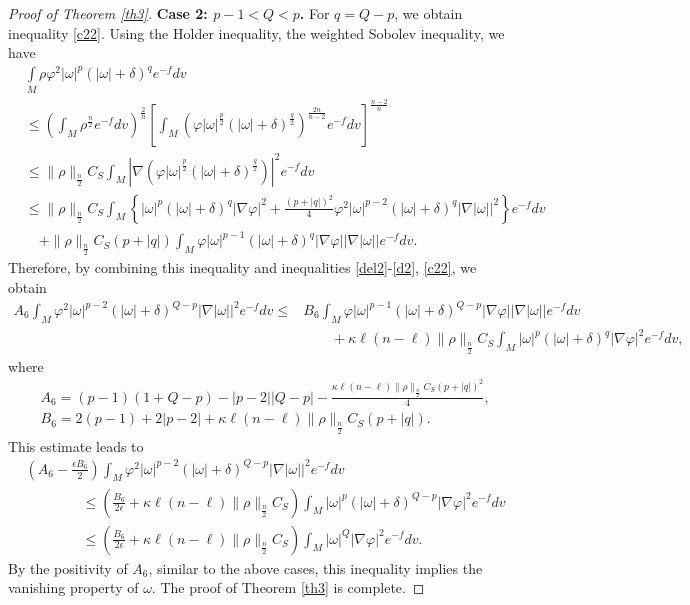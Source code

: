 \documentclass[10pt,a4paper]{amsart}
\numberwithin{equation}{section}
\begin{document}
\begin{proof}[Proof of Theorem \ref{th3}]
	\textbf{Case 2: $p-1<Q<p$.} For $q=Q-p$, we obtain inequality \eqref{c22}. Using the Holder inequality, the weighted Sobolev inequality, we have
	\begin{align*}
				&\int\limits_M \rho\varphi ^2|\omega |^{p}(|\omega|+\delta)^q e^{-f}dv\\
				&\le \left(\int_M \rho^{\frac{n}{2}}e^{-f}dv\right)^{\frac{2}{n}} \left[ \int_M \left(\varphi |\omega|^{\frac{p}{2}}(|\omega|+\delta)^{\frac{q}{2}}\right)^{\frac{2n}{n-2}}e^{-f}dv \right]^{\frac{n-2}{n}}\\
		&\le \|\rho\|_{\frac{n}{2}} C_S  \int_M \left|\nabla \left( \varphi |\omega|^{\frac{p}{2}}(|\omega|+\delta)^{\frac{q}{2}} \right)\right|^2 e^{-f}dv\\
			&\le \|\rho\|_{\frac{n}{2}} C_S  \int_M \left\{ |\omega|^p (|\omega|+\delta)^q |\nabla \varphi|^2 +\frac{(p+|q|)^2}{4}\varphi^2 |\omega|^{p-2}(|\omega|+\delta)^{q} |\nabla |\omega||^2  \right\}e^{-f}dv\\
			&\quad + \|\rho\|_{\frac{n}{2}} C_S(p+|q|)\int_M \varphi |\omega|^{p-1} (|\omega|+\delta)^{q} |\nabla \varphi| |\nabla |\omega|| e^{-f}dv.
	\end{align*}
	Therefore, by combining this inequality and inequalities \eqref{del2}-\eqref{d2}, \eqref{c22}, we obtain
		\begin{align*}\nonumber
		A_6 \int_M \varphi^2 |\omega|^{p-2} (|\omega|+\delta)^{Q-p}|\nabla|\omega||^2 e^{-f}dv \le &B_6 \int_M \varphi |\omega|^{p-1} (|\omega|+\delta)^{Q-p}|\nabla \varphi||\nabla|\omega||e^{-f}dv\\
		&\qquad +\kappa \ell (n-\ell)\|\rho\|_{\frac{n}{2}} C_S\int_M |\omega|^p (|\omega|+\delta)^q |\nabla \varphi|^2 e^{-f}dv,
	\end{align*}
	where
	\begin{align*}
		&A_6=(p-1)(1+Q-p)-|p-2||Q-p|-\frac{\kappa \ell (n-\ell)\|\rho\|_{\frac{n}{2}} C_S(p+|q|)^2}{4},\\
		&B_6=2(p-1)+2|p-2|+\kappa \ell (n-\ell)\|\rho\|_{\frac{n}{2}} C_S(p+|q|).
	\end{align*}
	This estimate leads to
		\begin{align}\nonumber
		&\left(A_6-\frac{\epsilon B_6}{2}\right) \int_M \varphi^2 |\omega|^{p-2}(|\omega|+\delta)^{Q-p}|\nabla|\omega||^2 e^{-f}dv \\ \nonumber
		&\qquad\qquad\le \left( \frac{B_6}{2\epsilon}+\kappa \ell (n-\ell) \|\rho\|_{\frac{n}{2}} C_S\right)\int_M |\omega|^{p} (|\omega|+\delta)^{Q-p}|\nabla \varphi|^2e^{-f}dv\\ \nonumber
		&\qquad\qquad\le \left( \frac{B_6}{2\epsilon}+\kappa \ell (n-\ell)\|\rho\|_{\frac{n}{2}} C_S \right) \int_M |\omega|^{Q} |\nabla \varphi|^2e^{-f}dv.
	\end{align}
	By the positivity of $ A_6$, similar to the above cases, this inequality implies the vanishing property of $\omega$. The proof of Theorem \ref{th3} is complete.
\end{proof}
\end{document}
